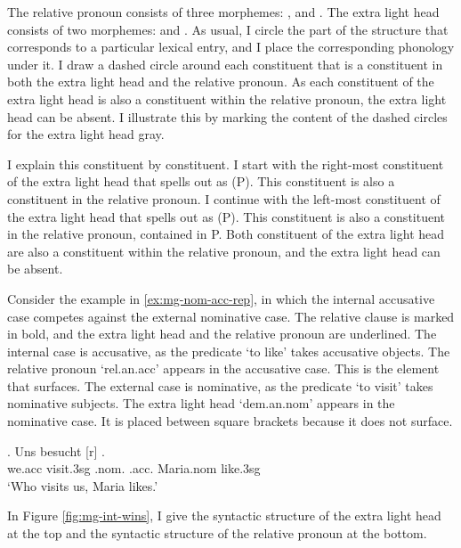The relative pronoun consists of three morphemes: ,  and .
The extra light head consists of two morphemes:  and .
As usual, I circle the part of the structure that corresponds to a particular lexical entry, and I place the corresponding phonology under it.
I draw a dashed circle around each constituent that is a constituent in both the extra light head and the relative pronoun.
As each constituent of the extra light head is also a constituent within the relative pronoun, the extra light head can be absent. I illustrate this by marking the content of the dashed circles for the extra light head gray.

I explain this constituent by constituent.
I start with the right-most constituent of the extra light head that spells out as  (P). This constituent is also a constituent in the relative pronoun.
I continue with the left-most constituent of the extra light head that spells out as  (P). This constituent is also a constituent in the relative pronoun, contained in P.
Both constituent of the extra light head are also a constituent within the relative pronoun, and the extra light head can be absent.

Consider the example in \ref{ex:mg-nom-acc-rep}, in which the internal accusative case competes against the external nominative case. The relative clause is marked in bold, and the extra light head and the relative pronoun are underlined.
The internal case is accusative, as the predicate  `to like' takes accusative objects. The relative pronoun  `\ac{rel}.\ac{an}.\ac{acc}' appears in the accusative case. This is the element that surfaces.
The external case is nominative, as the predicate  `to visit' takes nominative subjects. The extra light head  `\ac{dem}.\ac{an}.\ac{nom}' appears in the nominative case. It is placed between square brackets because it does not surface.

\exg. Uns besucht [r]   .\\
 we.\ac{acc} visit.3\ac{sg}\scsub{[nom]} .\ac{nom}. .\ac{acc}. Maria.\ac{nom} like.3\ac{sg}\scsub{[acc]}\\
 `Who visits us, Maria likes.' \label{ex:mg-nom-acc-rep}

In Figure \ref{fig:mg-int-wins}, I give the syntactic structure of the extra light head at the top and the syntactic structure of the relative pronoun at the bottom.

